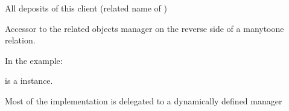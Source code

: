 \documentclass[letterpaper,10pt,russian]{sphinxmanual}
\begin{document}
\begin{fulllineitems}
\begin{fulllineitems}
\sphinxAtStartPar
All deposits of this client (related name of {\hyperref[\detokenize{myapp:polls.models.Deposit.client_id1}]{}})

\sphinxAtStartPar
Accessor to the related objects manager on the reverse side of a
many\sphinxhyphen{}to\sphinxhyphen{}one relation.

\sphinxAtStartPar
In the example:

\begin{sphinxVerbatim}[commandchars=\\\{\}]
       
\end{sphinxVerbatim}

\sphinxAtStartPar
{} is a  instance.

\sphinxAtStartPar
Most of the implementation is delegated to a dynamically defined manager

\end{fulllineitems}


\begin{fulllineitems}
\label{\detokenize{myapp:polls.models.Client.objects}}
\pysigstartsignatures
\pysigline
{}
\pysigstopsignatures
\end{fulllineitems}


\end{fulllineitems}

\end{document}
